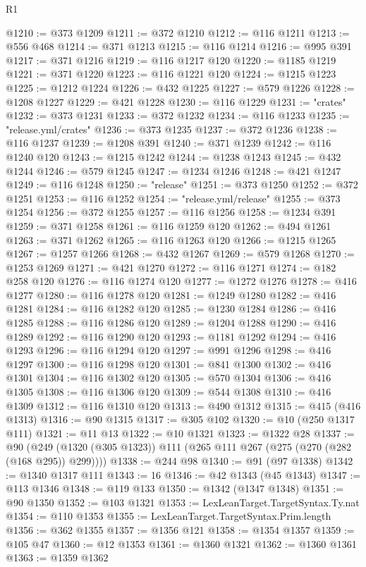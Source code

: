 \begin{lexlean}{R1}
\begin{coremodule}
@1210 := @373 @1209
@1211 := @372 @1210
@1212 := @116 @1211
@1213 := @556 @468
@1214 := @371 @1213
@1215 := @116 @1214
@1216 := @995 @391
@1217 := @371 @1216
@1219 := @116 @1217 @120
@1220 := @1185 @1219
@1221 := @371 @1220
@1223 := @116 @1221 @120
@1224 := @1215 @1223
@1225 := @1212 @1224
@1226 := @432 @1225
@1227 := @579 @1226
@1228 := @1208 @1227
@1229 := @421 @1228
@1230 := @116 @1229
@1231 := "crates"
@1232 := @373 @1231
@1233 := @372 @1232
@1234 := @116 @1233
@1235 := "release.yml/crates"
@1236 := @373 @1235
@1237 := @372 @1236
@1238 := @116 @1237
@1239 := @1208 @391
@1240 := @371 @1239
@1242 := @116 @1240 @120
@1243 := @1215 @1242
@1244 := @1238 @1243
@1245 := @432 @1244
@1246 := @579 @1245
@1247 := @1234 @1246
@1248 := @421 @1247
@1249 := @116 @1248
@1250 := "release"
@1251 := @373 @1250
@1252 := @372 @1251
@1253 := @116 @1252
@1254 := "release.yml/release"
@1255 := @373 @1254
@1256 := @372 @1255
@1257 := @116 @1256
@1258 := @1234 @391
@1259 := @371 @1258
@1261 := @116 @1259 @120
@1262 := @494 @1261
@1263 := @371 @1262
@1265 := @116 @1263 @120
@1266 := @1215 @1265
@1267 := @1257 @1266
@1268 := @432 @1267
@1269 := @579 @1268
@1270 := @1253 @1269
@1271 := @421 @1270
@1272 := @116 @1271
@1274 := @182 @258 @120
@1276 := @116 @1274 @120
@1277 := @1272 @1276
@1278 := @416 @1277
@1280 := @116 @1278 @120
@1281 := @1249 @1280
@1282 := @416 @1281
@1284 := @116 @1282 @120
@1285 := @1230 @1284
@1286 := @416 @1285
@1288 := @116 @1286 @120
@1289 := @1204 @1288
@1290 := @416 @1289
@1292 := @116 @1290 @120
@1293 := @1181 @1292
@1294 := @416 @1293
@1296 := @116 @1294 @120
@1297 := @991 @1296
@1298 := @416 @1297
@1300 := @116 @1298 @120
@1301 := @841 @1300
@1302 := @416 @1301
@1304 := @116 @1302 @120
@1305 := @570 @1304
@1306 := @416 @1305
@1308 := @116 @1306 @120
@1309 := @544 @1308
@1310 := @416 @1309
@1312 := @116 @1310 @120
@1313 := @490 @1312
@1315 := @415 (@416 @1313)
@1316 := @90 @1315
@1317 := @305 @102
@1320 := @10 (@250 @1317 @111)
@1321 := @11 @13
@1322 := @10 @1321
@1323 := @1322 @28
@1337 := @90 (@249 (@1320 (@305 @1323)) @111 (@265 @111 @267 (@275 (@270 (@282 (@168 @295)) @299))))
@1338 := @244 @98
@1340 := @91 (@97 @1338)
@1342 := @1340 @1317 @111
@1343 := 16
@1346 := @42 @1343 (@45 @1343)
@1347 := @113 @1346
@1348 := @119 @133
@1350 := @1342 (@1347 @1348)
@1351 := @90 @1350
@1352 := @103 @1321
@1353 := LexLeanTarget.TargetSyntax.Ty.nat
@1354 := @110 @1353
@1355 := LexLeanTarget.TargetSyntax.Prim.length
@1356 := @362 @1355
@1357 := @1356 @121
@1358 := @1354 @1357
@1359 := @105 @47
@1360 := @12 @1353
@1361 := @1360 @1321
@1362 := @1360 @1361
@1363 := @1359 @1362

\end{coremodule}
\end{lexlean}

